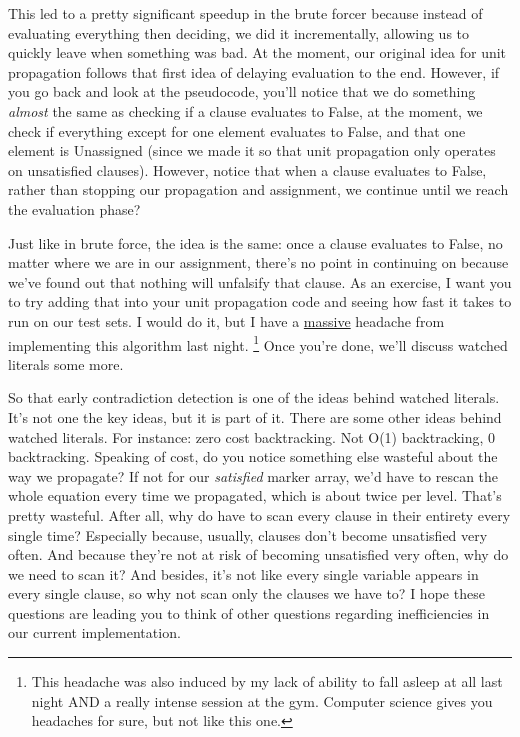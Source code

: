 \documentclass[oneside]{book}
\begin{document}
This led to a pretty significant speedup in the brute forcer because instead of evaluating everything 
then deciding, we did it incrementally, allowing us to quickly leave when something was bad. 
At the moment, our original idea for unit propagation follows that first idea of delaying 
evaluation to the end. However, if you go back and look at the pseudocode, you'll notice that we 
do something \textit{almost} the same as checking if a clause evaluates to False, at the moment,
we check if everything except for one element evaluates to False, and that one element is Unassigned
(since we made it so that unit propagation only operates on unsatisfied clauses). However, notice 
that when a clause evaluates to False, rather than stopping our propagation and assignment, we 
continue until we reach the evaluation phase? 

Just like in brute force, the idea is the same: once a clause evaluates to False, no matter 
where we are in our assignment, there's no point in continuing on because we've found out that 
nothing will unfalsify that clause. As an exercise, I want you to try adding that into your 
unit propagation code and seeing how fast it takes to run on our test sets. I would do it, but 
I have a \underline{massive} headache from implementing this algorithm last night.
\footnote{This headache was also induced by my lack of ability to fall asleep at all last night
AND a really intense session at the gym. Computer science gives you headaches for sure, but not like 
this one.}
Once you're done, we'll discuss watched literals some more.

So that early contradiction detection is one of the ideas behind watched literals. 
It's not one the key ideas, but it is part of it. There are some other ideas behind 
watched literals. For instance: zero cost backtracking. Not O(1) backtracking, $0$
backtracking. Speaking of cost, do you notice something else wasteful about the 
way we propagate? If not for our \textit{satisfied} marker array, we'd have to 
rescan the whole equation every time we propagated, which is about twice per level. 
That's pretty wasteful. After all, why do have to scan every clause in their entirety
every single time? Especially because, usually, clauses don't become unsatisfied very 
often. And because they're not at risk of becoming unsatisfied very often, why do we need 
to scan it? And besides, it's not like every single variable appears in every single 
clause, so why not scan only the clauses we have to? I hope these questions are leading 
you to think of other questions regarding inefficiencies in our current implementation.
\end{document}
